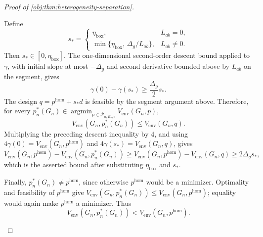 \begin{proof}[Proof of \cref{obj:thm:heterogeneity-separation}]
\begin{enumerate}
Define
\[
s_*= 
\begin{cases}
\eta_{\mathrm{box}}, & L_{ab}=0,\\
\min\{\eta_{\mathrm{box}},\,\Delta_g/L_{ab}\}, & L_{ab}\ne0 .
\end{cases}
\]
Then \(s_*\in[0,\eta_{\mathrm{box}}]\).  The one-dimensional second-order descent bound applied to \(\gamma\), with initial slope at most \(-\Delta_g\) and second derivative bounded above by \(L_{ab}\) on the segment, gives
\[
\gamma(0)-\gamma(s_*)\ge \frac{\Delta_g}{2}s_*.
\]
The design \(q=p^{\mathrm{hom}}+s_*d\) is feasible by the segment argument above.  Therefore, for every
\(p_n^*(G_n)\in\operatorname{argmin}_{p\in\mathcal P_{n,B_n,\epsilon}}
V_{\mathrm{env}}(G_n,p)\),
\[
V_{\mathrm{env}}(G_n,p_n^*(G_n))
\le V_{\mathrm{env}}(G_n,q).
\]
Multiplying the preceding descent inequality by \(4\), and using \(4\gamma(0)=V_{\mathrm{env}}(G_n,p^{\mathrm{hom}})\) and \(4\gamma(s_*)=V_{\mathrm{env}}(G_n,q)\), gives
\[
V_{\mathrm{env}}(G_n,p^{\mathrm{hom}})
-
V_{\mathrm{env}}(G_n,p_n^*(G_n))
\ge
V_{\mathrm{env}}(G_n,p^{\mathrm{hom}})
-
V_{\mathrm{env}}(G_n,q)
\ge 2\Delta_gs_* ,
\]
which is the asserted bound after substituting \(\eta_{\mathrm{box}}\) and \(s_*\).

Finally, \(p_n^*(G_n)\neq p^{\mathrm{hom}}\), since otherwise
\(p^{\mathrm{hom}}\) would be a minimizer.  Optimality and feasibility of \(p^{\mathrm{hom}}\) give
\(V_{\mathrm{env}}(G_n,p_n^*(G_n))\le V_{\mathrm{env}}(G_n,p^{\mathrm{hom}})\); equality would again make \(p^{\mathrm{hom}}\) a minimizer.  Thus
\[
V_{\mathrm{env}}(G_n,p_n^*(G_n))
<
V_{\mathrm{env}}(G_n,p^{\mathrm{hom}}).
\]


\end{enumerate}
\end{proof}
